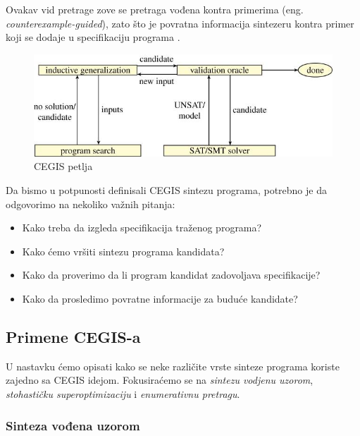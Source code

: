 Ovakav vid pretrage zove se pretraga vođena kontra primerima (eng. \emph{counterexample-guided}), zato što je povratna informacija sintezeru kontra primer koji se dodaje u specifikaciju programa \cite{PSE}.

\begin{figure}[t]
    \begin{center}
        \includegraphics[scale=0.4]{resources/cegis.jpeg}
    \end{center}
    \caption{CEGIS petlja \cite{AboutPS}}
    \label{fig:cegis}
\end{figure}


Da bismo u potpunosti definisali CEGIS sintezu programa, potrebno je da odgovorimo na nekoliko važnih pitanja:

\begin{itemize}
    \item Kako treba da izgleda specifikacija traženog programa?
    \item Kako ćemo vršiti sintezu programa kandidata?
    \item Kako da proverimo da li program kandidat zadovoljava specifikacije?
    \item Kako da prosledimo povratne informacije za buduće kandidate?
\end{itemize}

\subsection{Primene CEGIS-a}
\label{subsec:PrimeneCEGISa}

U nastavku ćemo opisati kako se neke različite vrste sinteze programa koriste zajedno sa CEGIS idejom. Fokusiraćemo se na \emph{sintezu vodjenu uzorom}, \emph{stohastičku superoptimizaciju} i \emph{enumerativnu pretragu}.


\subsubsection{Sinteza vođena uzorom}
\label{subsec:OracleGuidedSynthesis}

